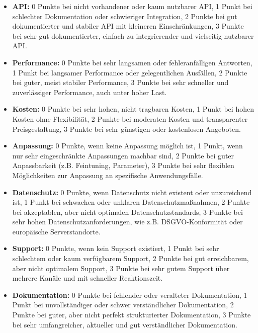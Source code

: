     \begin{itemize}
        \item \textbf{\acs{API}:} 0 Punkte bei nicht vorhandener oder kaum nutzbarer \acs{API}, 1 Punkt bei schlechter Dokumentation oder schwieriger Integration, 2 Punkte bei gut dokumentierter und stabiler \acs{API} mit kleineren Einschränkungen, 3 Punkte bei sehr gut dokumentierter, einfach zu integrierender und vielseitig nutzbarer \acs{API}.

        \item \textbf{Performance:} 0 Punkte bei sehr langsamen oder fehleranfälligen Antworten, 1 Punkt bei langsamer Performance oder gelegentlichen Ausfällen, 2 Punkte bei guter, meist stabiler Performance, 3 Punkte bei sehr schneller und zuverlässiger Performance, auch unter hoher Last.

        \item \textbf{Kosten:} 0 Punkte bei sehr hohen, nicht tragbaren Kosten, 1 Punkt bei hohen Kosten ohne Flexibilität, 2 Punkte bei moderaten Kosten und transparenter Preisgestaltung, 3 Punkte bei sehr günstigen oder kostenlosen Angeboten.

        \item \textbf{Anpassung:} 0 Punkte, wenn keine Anpassung möglich ist, 1 Punkt, wenn nur sehr eingeschränkte Anpassungen machbar sind, 2 Punkte bei guter Anpassbarkeit (z.B. Feintuning, Parameter), 3 Punkte bei sehr flexiblen Möglichkeiten zur Anpassung an spezifische Anwendungsfälle.

        \item \textbf{Datenschutz:} 0 Punkte, wenn Datenschutz nicht existent oder unzureichend ist, 1 Punkt bei schwachen oder unklaren Datenschutzmaßnahmen, 2 Punkte bei akzeptablen, aber nicht optimalen Datenschutzstandards, 3 Punkte bei sehr hohen Datenschutzanforderungen, wie z.B. DSGVO-Konformität oder europäische Serverstandorte.

        \item \textbf{Support:} 0 Punkte, wenn kein Support existiert, 1 Punkt bei sehr schlechtem oder kaum verfügbarem Support, 2 Punkte bei gut erreichbarem, aber nicht optimalem Support, 3 Punkte bei sehr gutem Support über mehrere Kanäle und mit schneller Reaktionszeit.

        \item \textbf{Dokumentation:} 0 Punkte bei fehlender oder veralteter Dokumentation, 1 Punkt bei unvollständiger oder schwer verständlicher Dokumentation, 2 Punkte bei guter, aber nicht perfekt strukturierter Dokumentation, 3 Punkte bei sehr umfangreicher, aktueller und gut verständlicher Dokumentation.
    \end{itemize}

